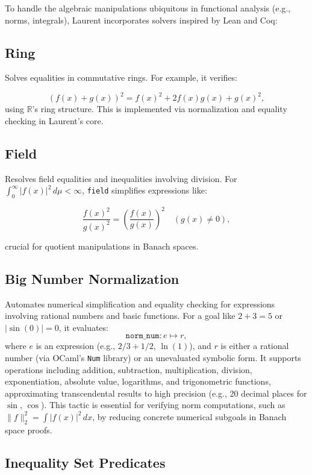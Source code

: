 \documentclass[12pt,twoside,draft]{cmpart}
\begin{document}
To handle the algebraic manipulations ubiquitous in functional
analysis (e.g., norms, integrals), Laurent incorporates solvers
inspired by Lean and Coq:


\subsection{Ring}

Solves equalities in commutative rings. For example, it verifies:

\[ (f(x) + g(x))^2 = f(x)^2 + 2 f(x) g(x) + g(x)^2, \]
using $\mathbb{R}$’s ring structure. This is implemented via
normalization and equality checking in Laurent’s core.

\subsection{Field}

Resolves field equalities and inequalities
involving division. For $\int_0^\infty |f(x)|^2 \, d\mu < \infty$,
\texttt{field} simplifies expressions like:

\[ \frac{f(x)^2}{g(x)^2} = \left( \frac{f(x)}{g(x)} \right)^2 \quad (g(x) \neq 0), \]

crucial for quotient manipulations in Banach spaces.

\subsection{Big Number Normalization}
Automates numerical simplification and equality checking for expressions involving rational numbers and basic functions. For a goal like \( 2 + 3 = 5 \) or \( |\sin(0)| = 0 \), it evaluates:
\[
\texttt{norm\_num} : e \mapsto r,
\]
where \( e \) is an expression (e.g., \( 2/3 + 1/2 \), \( \ln(1) \)), and \( r \) is either a rational number (via OCaml's \texttt{Num} library) or an unevaluated symbolic form. It supports operations including addition, subtraction, multiplication, division, exponentiation, absolute value, logarithms, and trigonometric functions, approximating transcendental results to high precision (e.g., 20 decimal places for \( \sin \), \( \cos \)). This tactic is essential for verifying norm computations, such as \( \|f\|_2^2 = \int |f(x)|^2 \, dx \), by reducing concrete numerical subgoals in Banach space proofs.

\subsection{Inequality Set Predicates}
\end{document}
